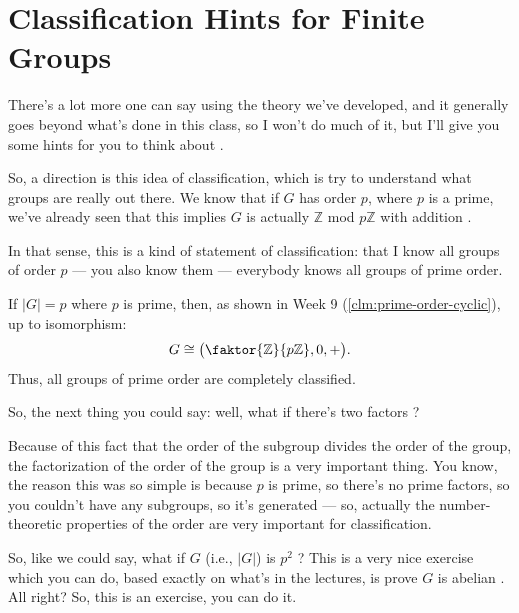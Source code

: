 \section{Classification Hints for Finite Groups}

\begin{speech}[00:26:56 - 00:27:59]
There's a lot more one can say using the theory we've developed, and it generally goes beyond what's done in this class, so I won't do much of it, but I'll give you some hints for you to think about .

So, a direction is this idea of classification, which is try to understand what groups are really out there. We know that if $G$ has order $p$, where $p$ is a prime, we've already seen that this implies $G$ is actually $\mathbb{Z}$ mod $p\mathbb{Z}$ with addition .

In that sense, this is a kind of statement of classification: that I know all groups of order $p$ --- you also know them --- everybody knows all groups of prime order.
\end{speech}

\begin{content}
If $|G| = p$ where $p$ is prime, then, as shown in Week 9 (\cref{clm:prime-order-cyclic}), up to isomorphism:
\[
G \cong \bigl(\faktor{\mathbb{Z}}{p\mathbb{Z}}, 0, +\bigr).
\]
Thus, all groups of prime order are completely classified.
\end{content}

\begin{speech}[00:27:59 - 00:28:49]
So, the next thing you could say: well, what if there's two factors ?

Because of this fact that the order of the subgroup divides the order of the group, the factorization of the order of the group is a very important thing. You know, the reason this was so simple is because $p$ is prime, so there's no prime factors, so you couldn't have any subgroups, so it's generated --- so, actually the number-theoretic properties of the order are very important for classification.

So, like we could say, what if $G$ (i.e., $|G|$) is $p^2$ ? This is a very nice exercise which you can do, based exactly on what's in the lectures, is prove $G$ is abelian . All right? So, this is an exercise, you can do it.
\end{speech}

